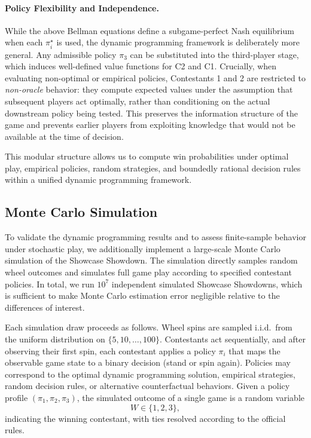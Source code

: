 \documentclass[titlepage,12pt]{article}
\begin{document}
\paragraph{Policy Flexibility and Independence.}
While the above Bellman equations define a subgame-perfect Nash equilibrium when each $\pi_i^\star$ is used, the dynamic programming framework is deliberately more general. Any admissible policy $\pi_3$ can be substituted into the third-player stage, which induces well-defined value functions for C2 and C1. Crucially, when evaluating non-optimal or empirical policies, Contestants 1 and 2 are restricted to \emph{non-oracle} behavior: they compute expected values under the assumption that subsequent players act optimally, rather than conditioning on the actual downstream policy being tested. This preserves the information structure of the game and prevents earlier players from exploiting knowledge that would not be available at the time of decision.

This modular structure allows us to compute win probabilities under optimal play, empirical policies, random strategies, and boundedly rational decision rules within a unified dynamic programming framework.

\subsection{Monte Carlo Simulation}

To validate the dynamic programming results and to assess finite-sample behavior under stochastic play, we additionally implement a large-scale Monte Carlo simulation of the Showcase Showdown. The simulation directly samples random wheel outcomes and simulates full game play according to specified contestant policies. In total, we run $10^7$ independent simulated Showcase Showdowns, which is sufficient to make Monte Carlo estimation error negligible relative to the differences of interest.

Each simulation draw proceeds as follows. Wheel spins are sampled i.i.d.\ from the uniform distribution on $\{5,10,\ldots,100\}$. Contestants act sequentially, and after observing their first spin, each contestant applies a policy $\pi_i$ that maps the observable game state to a binary decision (stand or spin again). Policies may correspond to the optimal dynamic programming solution, empirical strategies, random decision rules, or alternative counterfactual behaviors. Given a policy profile $(\pi_1,\pi_2,\pi_3)$, the simulated outcome of a single game is a random variable
\[
W \in \{1,2,3\},
\]
indicating the winning contestant, with ties resolved according to the official rules.
\end{document}
